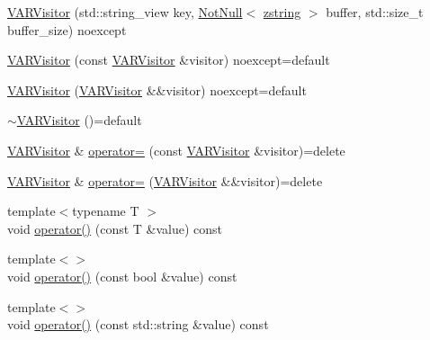 \begin{DoxyCompactItemize}
\item 
\mbox{\hyperlink{classmage_1_1loader_1_1anonymous__namespace_02var__writer_8cpp_03_1_1_v_a_r_visitor_a6ca2f3efcddcd80ba43261df803a91bf}{V\+A\+R\+Visitor}} (std\+::string\+\_\+view key, \mbox{\hyperlink{namespacemage_a8769f9d670d6b585ea306cb1062af94b}{Not\+Null}}$<$ \mbox{\hyperlink{namespacemage_a4163ec9a9a27d5e7f4b452dcb99cb2b9}{zstring}} $>$ buffer, std\+::size\+\_\+t buffer\+\_\+size) noexcept
\item 
\mbox{\hyperlink{classmage_1_1loader_1_1anonymous__namespace_02var__writer_8cpp_03_1_1_v_a_r_visitor_a82f3a1a67bf514b9ac2ed972cf31d039}{V\+A\+R\+Visitor}} (const \mbox{\hyperlink{classmage_1_1loader_1_1anonymous__namespace_02var__writer_8cpp_03_1_1_v_a_r_visitor}{V\+A\+R\+Visitor}} \&visitor) noexcept=default
\item 
\mbox{\hyperlink{classmage_1_1loader_1_1anonymous__namespace_02var__writer_8cpp_03_1_1_v_a_r_visitor_a6d58f255b7449eee24a08dacacebdeec}{V\+A\+R\+Visitor}} (\mbox{\hyperlink{classmage_1_1loader_1_1anonymous__namespace_02var__writer_8cpp_03_1_1_v_a_r_visitor}{V\+A\+R\+Visitor}} \&\&visitor) noexcept=default
\item 
\mbox{\hyperlink{classmage_1_1loader_1_1anonymous__namespace_02var__writer_8cpp_03_1_1_v_a_r_visitor_afc2fb3e2bb3ca6987962a083ecb09f67}{$\sim$\+V\+A\+R\+Visitor}} ()=default
\item 
\mbox{\hyperlink{classmage_1_1loader_1_1anonymous__namespace_02var__writer_8cpp_03_1_1_v_a_r_visitor}{V\+A\+R\+Visitor}} \& \mbox{\hyperlink{classmage_1_1loader_1_1anonymous__namespace_02var__writer_8cpp_03_1_1_v_a_r_visitor_a5945e980f4521469baea5ef944bb0a83}{operator=}} (const \mbox{\hyperlink{classmage_1_1loader_1_1anonymous__namespace_02var__writer_8cpp_03_1_1_v_a_r_visitor}{V\+A\+R\+Visitor}} \&visitor)=delete
\item 
\mbox{\hyperlink{classmage_1_1loader_1_1anonymous__namespace_02var__writer_8cpp_03_1_1_v_a_r_visitor}{V\+A\+R\+Visitor}} \& \mbox{\hyperlink{classmage_1_1loader_1_1anonymous__namespace_02var__writer_8cpp_03_1_1_v_a_r_visitor_a1881ef3c23c5d0085323928643176691}{operator=}} (\mbox{\hyperlink{classmage_1_1loader_1_1anonymous__namespace_02var__writer_8cpp_03_1_1_v_a_r_visitor}{V\+A\+R\+Visitor}} \&\&visitor)=delete
\item 
{\footnotesize template$<$typename T $>$ }\\void \mbox{\hyperlink{classmage_1_1loader_1_1anonymous__namespace_02var__writer_8cpp_03_1_1_v_a_r_visitor_a2809487cd67390783e8981347a6ee834}{operator()}} (const T \&value) const
\item 
{\footnotesize template$<$$>$ }\\void \mbox{\hyperlink{classmage_1_1loader_1_1anonymous__namespace_02var__writer_8cpp_03_1_1_v_a_r_visitor_a558b5c4f14491951caf1616a87a5da8e}{operator()}} (const bool \&value) const
\item 
{\footnotesize template$<$$>$ }\\void \mbox{\hyperlink{classmage_1_1loader_1_1anonymous__namespace_02var__writer_8cpp_03_1_1_v_a_r_visitor_a19c914e1581e21d051e139ac7716dade}{operator()}} (const std\+::string \&value) const
\end{DoxyCompactItemize}
